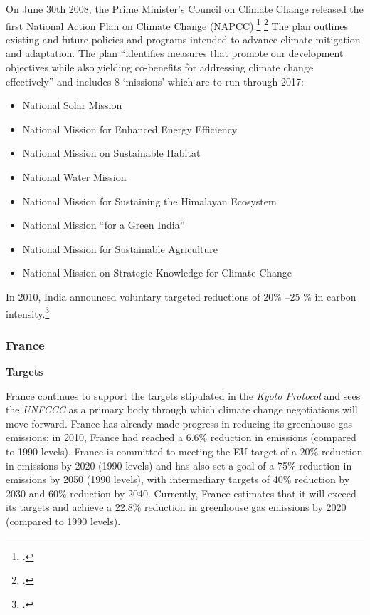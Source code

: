 On June 30th 2008, the Prime Minister's Council on Climate Change released the first National Action Plan on Climate Change (NAPCC).\footcite[][]{IndiaPlan2008} \footcite[See also: ][]{IndiaActionSummary}
The plan outlines existing and future policies and programs intended to advance climate mitigation and adaptation. 
The plan ``identifies measures that promote our development objectives while also yielding co-benefits for addressing climate change effectively'' and includes 8 `missions' which are to run through 2017:
\begin{itemize}
	\item National Solar Mission 
	\item National Mission for Enhanced Energy Efficiency
	\item National Mission on Sustainable Habitat
	\item National Water Mission
	\item National Mission for Sustaining the Himalayan Ecosystem
	\item National Mission “for a Green India”
	\item National Mission for Sustainable Agriculture
	\item National Mission on Strategic Knowledge for Climate Change
\end{itemize}



In 2010, India announced voluntary targeted reductions of 20\% --25 \% in carbon intensity.\footcite[][p. 108]{UNHumanDev2013}



	\subsubsection{France}
	


\textbf{Targets}



France continues to support the targets stipulated in the \emph{Kyoto Protocol} and sees the \emph{UNFCCC} as a primary body through which climate change negotiations will move forward. 
France has already made progress in reducing its greenhouse gas emissions; in 2010, France had reached a 6.6\% reduction in emissions (compared to 1990 levels). 
France is committed to meeting the EU target of a 20\% reduction in emissions by 2020 (1990 levels) and has also set a goal of a 75\% reduction in emissions by 2050 (1990 levels), with intermediary targets of 40\% reduction by 2030 and 60\% reduction by 2040.  
Currently, France estimates that it will exceed its targets and achieve a 22.8\% reduction in greenhouse gas emissions by 2020 (compared to 1990 levels).



